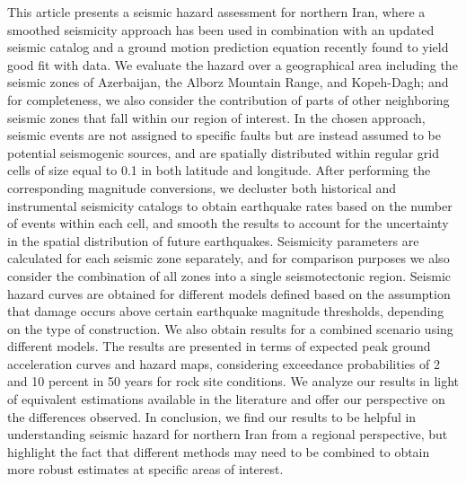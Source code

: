 % 
This article presents a seismic hazard assessment for northern Iran, where a smoothed seismicity approach has been used in combination with an updated seismic catalog and a ground motion prediction equation recently found to yield good fit with data. We evaluate the hazard over a geographical area including the seismic zones of Azerbaijan, the Alborz Mountain Range, and Kopeh-Dagh; and for completeness, we also consider the contribution of parts of other neighboring seismic zones that fall within our region of interest. In the chosen approach, seismic events are not assigned to specific faults but are instead assumed to be potential seismogenic sources, and are spatially distributed within regular grid cells of size equal to 0.1\textdegree{} in both latitude and longitude. After performing the corresponding magnitude conversions, we decluster both historical and instrumental seismicity catalogs to obtain earthquake rates based on the number of events within each cell, and smooth the results to account for the uncertainty in the spatial distribution of future earthquakes. Seismicity parameters are calculated for each seismic zone separately, and for comparison purposes we also consider the combination of all zones into a single seismotectonic region. Seismic hazard curves are obtained for different models defined based on the assumption that damage occurs above certain earthquake magnitude thresholds, depending on the type of construction. We also obtain results for a combined scenario using different models. The results are presented in terms of expected peak ground acceleration curves and hazard maps, considering exceedance probabilities of 2 and 10 percent in 50 years for rock site conditions. We analyze our results in light of equivalent estimations available in the literature and offer our perspective on the differences observed. In conclusion, we find our results to be helpful in understanding seismic hazard for northern Iran from a regional perspective, but highlight the fact that different methods may need to be combined to obtain more robust estimates at specific areas of interest.

